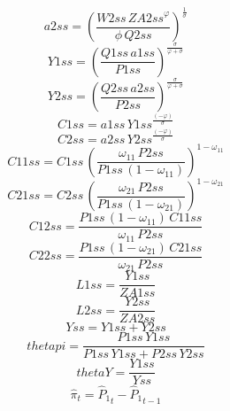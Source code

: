 \begin{dmath*}
a2ss = \left(\frac{{W2ss}\, {ZA2ss}^{{{\varphi}}}}{{{\phi}}\, {Q2ss}}\right)^{\frac{1}{{{\sigma}}}}
\end{dmath*}
\begin{dmath*}
Y1ss = \left(\frac{{Q1ss}\, {a1ss}}{{P1ss}}\right)^{\frac{{{\sigma}}}{{{\varphi}}+{{\sigma}}}}
\end{dmath*}
\begin{dmath*}
Y2ss = \left(\frac{{Q2ss}\, {a2ss}}{{P2ss}}\right)^{\frac{{{\sigma}}}{{{\varphi}}+{{\sigma}}}}
\end{dmath*}
\begin{dmath*}
C1ss = {a1ss}\, {Y1ss}^{\frac{\left(-{{\varphi}}\right)}{{{\sigma}}}}
\end{dmath*}
\begin{dmath*}
C2ss = {a2ss}\, {Y2ss}^{\frac{\left(-{{\varphi}}\right)}{{{\sigma}}}}
\end{dmath*}
\begin{dmath*}
C11ss = {C1ss}\, \left(\frac{{{\omega_{11}}}\, {P2ss}}{{P1ss}\, \left(1-{{\omega_{11}}}\right)}\right)^{1-{{\omega_{11}}}}
\end{dmath*}
\begin{dmath*}
C21ss = {C2ss}\, \left(\frac{{{\omega_{21}}}\, {P2ss}}{{P1ss}\, \left(1-{{\omega_{21}}}\right)}\right)^{1-{{\omega_{21}}}}
\end{dmath*}
\begin{dmath*}
C12ss = \frac{{P1ss}\, \left(1-{{\omega_{11}}}\right)\, {C11ss}}{{{\omega_{11}}}\, {P2ss}}
\end{dmath*}
\begin{dmath*}
C22ss = \frac{{P1ss}\, \left(1-{{\omega_{21}}}\right)\, {C21ss}}{{{\omega_{21}}}\, {P2ss}}
\end{dmath*}
\begin{dmath*}
L1ss = \frac{{Y1ss}}{{ZA1ss}}
\end{dmath*}
\begin{dmath*}
L2ss = \frac{{Y2ss}}{{ZA2ss}}
\end{dmath*}
\begin{dmath*}
Yss = {Y1ss}+{Y2ss}
\end{dmath*}
\begin{dmath*}
thetapi = \frac{{P1ss}\, {Y1ss}}{{P1ss}\, {Y1ss}+{P2ss}\, {Y2ss}}
\end{dmath*}
\begin{dmath*}
thetaY = \frac{{Y1ss}}{{Yss}}
\end{dmath*}
\begin{dmath}
{{\hat{\pi}}}_{t}={{\hat{P}_{1}}}_{t}-{{\hat{P}_{1}}}_{t-1}
\end{dmath}
